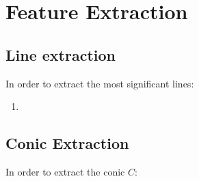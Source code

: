 \chapter{Feature Extraction}
\label{ch:Feature Extraction}

\section{Line extraction}
In order to extract the most significant lines:
\begin{enumerate}
    \item 
\end{enumerate}

\section{Conic Extraction}
In order to extract the conic $C$:
